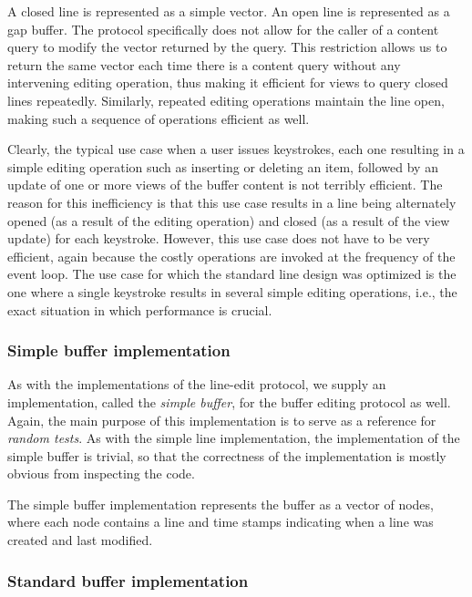 A closed line is represented as a \commonlisp{} simple vector.  An
open line is represented as a gap buffer. 
The protocol specifically does not allow for the caller of a content
query to modify the vector returned by the query.  This restriction
allows us to return the same vector each time there is a content
query without any intervening editing operation, thus making it
efficient for views to query closed lines repeatedly.  Similarly,
repeated editing operations maintain the line open, making such a
sequence of operations efficient as well.

Clearly, the typical use case when a user issues keystrokes, each one
resulting in a simple editing operation such as inserting or deleting
an item, followed by an update of one or more views of the buffer
content is not terribly efficient.  The reason for this inefficiency
is that this use case results in a line being alternately opened (as a
result of the editing operation) and closed (as a result of the view
update) for each keystroke.  However, this use case does not have to
be very efficient, again because the costly operations are invoked at
the frequency of the event loop.  The use case for which the standard
line design was optimized is the one where a single keystroke results
in several simple editing operations, i.e., the exact situation in
which performance is crucial.

\subsubsection{Simple buffer implementation}

As with the implementations of the line-edit protocol, we supply an
implementation, called the \emph{simple buffer}, for the buffer
editing protocol as well.  Again, the main purpose of this
implementation is to serve as a reference for \emph{random tests}.  As
with the simple line implementation, the implementation of the simple
buffer is trivial, so that the correctness of the implementation is
mostly obvious from inspecting the code.

The simple buffer implementation represents the buffer as a
\commonlisp{} vector of nodes, where each node contains a line and
time stamps indicating when a line was created and last modified.

\subsubsection{Standard buffer implementation}

